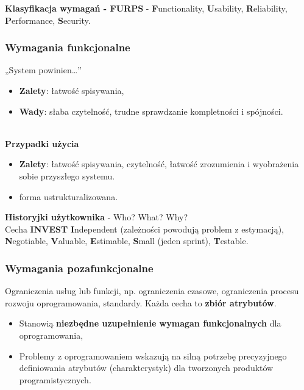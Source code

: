 \documentclass[a4paper]{article}
\begin{document}
    \textbf{Klasyfikacja wymagań - FURPS} - \textbf{F}unctionality, \textbf{U}sability, \textbf{R}eliability,
   \textbf{P}erformance, \textbf{S}ecurity.

    \subsubsection{Wymagania funkcjonalne}
    „System powinien\dots”
    \begin{itemize}
        \item \textbf{Zalety}: łatwość spisywania,
        \item \textbf{Wady}: słaba czytelność, trudne sprawdzanie kompletności i spójności.
    \end{itemize}

\hfill \\
    \textbf{Przypadki użycia}
    \begin{itemize}
        \item \textbf{Zalety}: łatwość spisywania, czytelność, łatwość zrozumienia i wyobrażenia sobie
        przyszłego systemu.
        \item forma ustrukturalizowana.
    \end{itemize}

    \textbf{Historyjki użytkownika} - Who? What? Why?\\
    Cecha \textbf{INVEST} \textbf{I}ndependent (zależności powodują problem z estymacją), \textbf{N}egotiable, \textbf{V}aluable, \textbf{E}stimable, \textbf{S}mall (jeden sprint), \textbf{T}estable.


    \subsubsection{Wymagania pozafunkcjonalne}
    Ograniczenia usług lub funkcji, np. ograniczenia czasowe, ograniczenia procesu rozwoju oprogramowania, standardy.
    Każda cecha to \textbf{zbiór atrybutów}.


    \begin{itemize}
        \item Stanowią \textbf{niezbędne uzupełnienie wymagan funkcjonalnych} dla oprogramowania,
        \item Problemy z oprogramowaniem wskazują na silną potrzebę precyzyjnego definiowania atrybutów
        (charakterystyk) dla tworzonych produktów programistycznych.
    \end{itemize}
\end{document}
